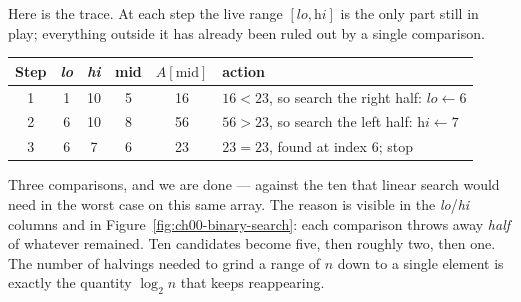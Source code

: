 Here is the trace. At each step the live range $[\textit{lo},\textit{hi}]$ is the
only part still in play; everything outside it has already been ruled out by a
single comparison.

\begin{center}
\begin{tabular}{@{}cccccl@{}}
\toprule
\textbf{Step} & \textit{lo} & \textit{hi} & \textbf{mid} & $A[\text{mid}]$ & \textbf{action} \\
\midrule
1 & 1 & 10 & 5 & 16 & $16 < 23$, so search the right half: $\textit{lo} \leftarrow 6$ \\
2 & 6 & 10 & 8 & 56 & $56 > 23$, so search the left half: $\textit{hi} \leftarrow 7$ \\
3 & 6 & 7  & 6 & 23 & $23 = 23$, found at index $6$; stop \\
\bottomrule
\end{tabular}
\end{center}

Three comparisons, and we are done --- against the ten that linear search would
need in the worst case on this same array. The reason is visible in the
\emph{lo}/\emph{hi} columns and in Figure~\ref{fig:ch00-binary-search}: each comparison throws away \emph{half} of whatever
remained. Ten candidates become five, then roughly two, then one. The number of
halvings needed to grind a range of $n$ down to a single element is exactly the
quantity $\log_2 n$ that keeps reappearing.

